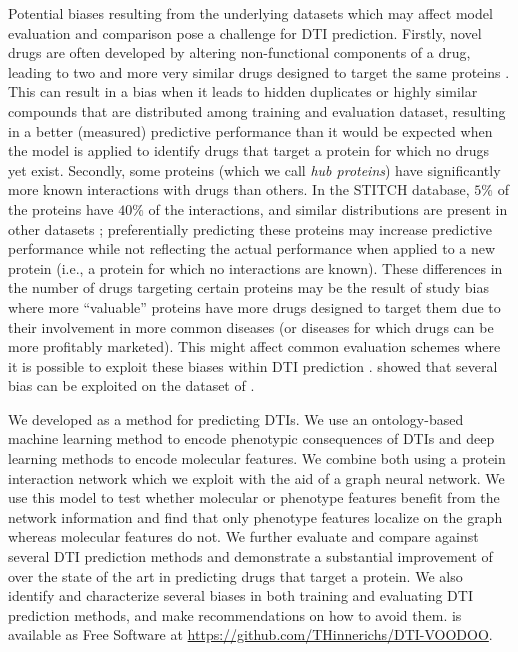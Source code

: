 \documentclass{bioinfo}
\renewcommand{\cite}{\citep}
\begin{document}
Potential biases resulting from
the underlying datasets \citep{Pahikkala2014} which may affect model
evaluation and comparison pose a challenge for DTI
prediction. Firstly, novel drugs are often developed by
altering non-functional components of a drug, leading to two and more
very similar drugs designed to target the same proteins
\cite{Overington2006}. This can result in a bias when it leads to
hidden duplicates or highly similar compounds that are distributed
among training and evaluation dataset, resulting in a better
(measured) predictive performance than it would be expected when the
model is applied to identify drugs that target a protein for which no
drugs yet exist. Secondly, some proteins (which we call \textit{hub
  proteins}) have significantly more known interactions with drugs
than others. In the STITCH database, $5\%$ of the proteins have $40\%$
of the interactions, and similar distributions are present in other
datasets \cite{Drugbank2007, Drugbank2017}; preferentially predicting
these proteins may increase predictive performance while not
reflecting the actual performance when applied to a new protein (i.e.,
a protein for which no interactions are known). These differences in
the number of drugs targeting certain proteins may be the result of
study bias where more ``valuable'' proteins have more drugs designed
to target them due to their involvement in more common diseases (or
diseases for which drugs can be more profitably marketed). This might
affect common evaluation schemes \cite{Survey2018} where it is possible
to exploit these biases within DTI prediction \cite{}.
\citet{vanLaarhoven2014} showed that several bias can be exploited on
the dataset of \citet{Yamanishi2008}.

We developed \name{} as a method for predicting DTIs. We use an
ontology-based machine learning method \cite{DL2vec2020} to encode
phenotypic consequences of DTIs and deep learning methods to encode
molecular features. We combine both using a protein interaction
network which we exploit with the aid of a graph neural network. We use this
model to test whether molecular or phenotype features benefit from the
network information and find that only phenotype features localize on
the graph whereas molecular features do not. We further evaluate and
compare \name{} against several DTI prediction methods and demonstrate
a substantial improvement of \name{} over the state of the art in
predicting drugs that target a protein. We also identify and
characterize several biases in both training and evaluating DTI
prediction methods, and make recommendations on how to avoid
them. \name{} is available as Free Software at
\url{https://github.com/THinnerichs/DTI-VOODOO}.
\end{document}
